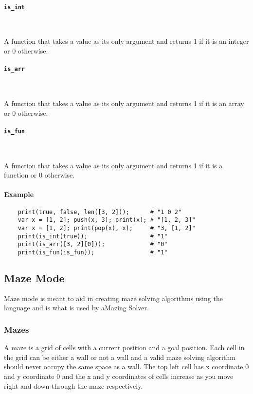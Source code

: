 \paragraph{\texttt{is\_int}} \

A function that takes a value as its only argument and returns 1 if it is an integer or 0 otherwise.

\paragraph{\texttt{is\_arr}} \

A function that takes a value as its only argument and returns 1 if it is an array or 0 otherwise.

\paragraph{\texttt{is\_fun}} \

A function that takes a value as its only argument and returns 1 if it is a function or 0 otherwise.

\paragraph{Example}

\begin{verbatim}
    print(true, false, len([3, 2]));      # "1 0 2"
    var x = [1, 2]; push(x, 3); print(x); # "[1, 2, 3]"
    var x = [1, 2]; print(pop(x), x);     # "3, [1, 2]"
    print(is_int(true));                  # "1"
    print(is_arr([3, 2][0]));             # "0"
    print(is_fun(is_fun));                # "1"
\end{verbatim}

\subsection{Maze Mode}

Maze mode is meant to aid in creating maze solving algorithms using the language and is what is used by aMazing Solver.

\subsubsection{Mazes}

A maze is a grid of cells with a current position and a goal position. Each cell in the grid can be either a wall or not a wall and a valid maze solving algorithm should never occupy the same space as a wall. The top left cell has x coordinate 0 and y coordinate 0 and the x and y coordinates of cells increase as you move right and down through the maze respectively.

